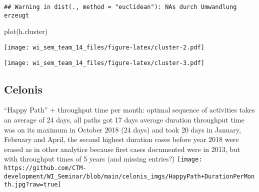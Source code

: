 \documentclass[
]{article}
\newenvironment{Shaded}{\begin{snugshade}}{\end{snugshade}}
\newcommand{\AttributeTok}[1]{\textcolor[rgb]{0.77,0.63,0.00}{#1}}
\newcommand{\DecValTok}[1]{\textcolor[rgb]{0.00,0.00,0.81}{#1}}
\newcommand{\FunctionTok}[1]{\textcolor[rgb]{0.00,0.00,0.00}{#1}}
\newcommand{\NormalTok}[1]{#1}
\newcommand{\OtherTok}[1]{\textcolor[rgb]{0.56,0.35,0.01}{#1}}
\newcommand{\SpecialCharTok}[1]{\textcolor[rgb]{0.00,0.00,0.00}{#1}}
\newcommand{\StringTok}[1]{\textcolor[rgb]{0.31,0.60,0.02}{#1}}
\begin{document}
\begin{verbatim}
## Warning in dist(., method = "euclidean"): NAs durch Umwandlung erzeugt
\end{verbatim}

\begin{Shaded}
\begin{Highlighting}[]
\FunctionTok{plot}\NormalTok{(h.cluster)}
\end{Highlighting}
\end{Shaded}

\texttt{[image: wi\_sem\_team\_14\_files/figure-latex/cluster-2.pdf]}

\begin{Shaded}
\end{Shaded}

\texttt{[image: wi\_sem\_team\_14\_files/figure-latex/cluster-3.pdf]}

\hypertarget{celonis}{%
\subsection{Celonis}\label{celonis}}

``Happy Path'' + throughput time per month: optimal sequence of
activities takes an average of 24 days, all paths got 17 days average
duration throughput time was on its maximum in October 2018 (24 days)
and took 20 days in January, February and April, the second highest
duration cases before year 2018 were erased as in other analytics
because first cases documented were in 2013, but with throughput times
of 5 years (and missing entries?)
\texttt{[image: https://github.com/CTM-development/WI\_Seminar/blob/main/celonis\_imgs/HappyPath+DurationPerMonth.jpg?raw=true]}
\end{document}
